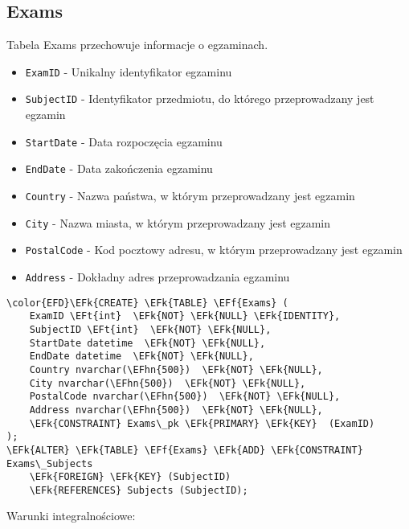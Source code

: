 \documentclass[11pt]{article}
\newcommand{\EFk}[1]{\textcolor{EFk}{\textbf{#1}}} %
\newcommand{\EFf}[1]{\textcolor{EFf}{#1}} %
\newcommand{\EFt}[1]{\textcolor{EFt}{\textbf{#1}}} %
\newcommand{\EFhn}[1]{\textcolor{EFhn}{#1}} %
\begin{document}
\subsection{Exams}
\label{sec:org7fd0ab0}
Tabela Exams przechowuje informacje o egzaminach.
\begin{itemize}
\item \texttt{ExamID} - Unikalny identyfikator egzaminu
\item \texttt{SubjectID} - Identyfikator przedmiotu, do którego przeprowadzany jest egzamin
\item \texttt{StartDate} - Data rozpoczęcia egzaminu
\item \texttt{EndDate} - Data zakończenia egzaminu
\item \texttt{Country} - Nazwa państwa, w którym przeprowadzany jest egzamin
\item \texttt{City} - Nazwa miasta, w którym przeprowadzany jest egzamin
\item \texttt{PostalCode} - Kod pocztowy adresu, w którym przeprowadzany jest egzamin
\item \texttt{Address} - Dokładny adres przeprowadzania egzaminu
\end{itemize}
\begin{Code}
\begin{Verbatim}
\color{EFD}\EFk{CREATE} \EFk{TABLE} \EFf{Exams} (
    ExamID \EFt{int}  \EFk{NOT} \EFk{NULL} \EFk{IDENTITY},
    SubjectID \EFt{int}  \EFk{NOT} \EFk{NULL},
    StartDate datetime  \EFk{NOT} \EFk{NULL},
    EndDate datetime  \EFk{NOT} \EFk{NULL},
    Country nvarchar(\EFhn{500})  \EFk{NOT} \EFk{NULL},
    City nvarchar(\EFhn{500})  \EFk{NOT} \EFk{NULL},
    PostalCode nvarchar(\EFhn{500})  \EFk{NOT} \EFk{NULL},
    Address nvarchar(\EFhn{500})  \EFk{NOT} \EFk{NULL},
    \EFk{CONSTRAINT} Exams\_pk \EFk{PRIMARY} \EFk{KEY}  (ExamID)
);
\EFk{ALTER} \EFk{TABLE} \EFf{Exams} \EFk{ADD} \EFk{CONSTRAINT} Exams\_Subjects
    \EFk{FOREIGN} \EFk{KEY} (SubjectID)
    \EFk{REFERENCES} Subjects (SubjectID);
\end{Verbatim}
\end{Code}
Warunki integralnościowe:
\end{document}
